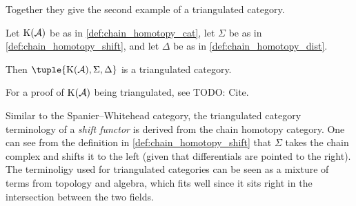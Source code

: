 Together they give the second example of a triangulated category.

\begin{example}
    Let \( \operatorname{K}({\mathcal{A}}) \) be as in \autoref{def:chain_homotopy_cat}, let \( \Sigma \) be as in \autoref{def:chain_homotopy_shift}, and let \( \Delta \) be as in \autoref{def:chain_homotopy_dist}.

    Then \( \tuple{\K(\Ac), \Sigma, \Delta} \) is a triangulated category.
\end{example}

For a proof of \( \operatorname{K}({\mathcal{A}}) \) being triangulated, see TODO: Cite.

Similar to the Spanier--Whitehead category, the triangulated category terminology of a \emph{shift functor} is derived from the chain homotopy category. One can see from the definition in \autoref{def:chain_homotopy_shift} that \( \Sigma \) takes the chain complex and shifts it to the left (given that differentials are pointed to the right). The terminoligy used for triangulated categories can be seen as a mixture of terms from topology and algebra, which fits well since it sits right in the intersection between the two fields.

